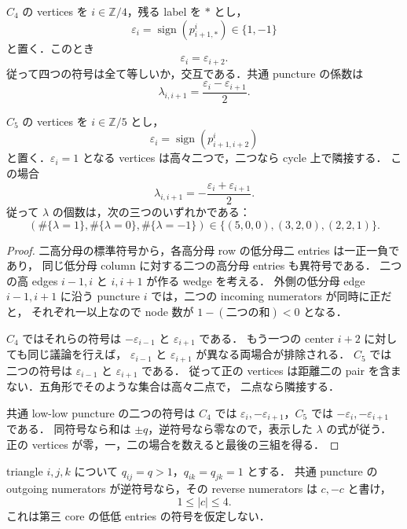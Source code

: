 \begin{proposition}\label{cn12:cycle-signs}
$C_4$ の vertices を $i\in\mathbb Z/4$，残る label を $*$ とし，
\[
 \varepsilon_i=\operatorname{sign}(p^i_{i+1,*})\in\{1,-1\}
\]
と置く．このとき
\[
 \varepsilon_i=\varepsilon_{i+2}.
\]
従って四つの符号は全て等しいか，交互である．共通 puncture の係数は
\[
 \lambda_{i,i+1}=\frac{\varepsilon_i-\varepsilon_{i+1}}2.
\]

$C_5$ の vertices を $i\in\mathbb Z/5$ とし，
\[
 \varepsilon_i=\operatorname{sign}(p^i_{i+1,i+2})
\]
と置く．$\varepsilon_i=1$ となる vertices は高々二つで，二つなら cycle 上で隣接する．
この場合
\[
 \lambda_{i,i+1}=-\frac{\varepsilon_i+\varepsilon_{i+1}}2.
\]
従って $\lambda$ の個数は，次の三つのいずれかである：
\[
 (\#\{\lambda=1\},\#\{\lambda=0\},\#\{\lambda=-1\})
 \in\{(5,0,0),(3,2,0),(2,2,1)\}.
\]
\end{proposition}

\begin{proof}
二高分母の標準符号から，各高分母 row の低分母二 entries は一正一負であり，
同じ低分母 column に対する二つの高分母 entries も異符号である．
二つの高 edges $i-1,i$ と $i,i+1$ が作る wedge を考える．
外側の低分母 edge $i-1,i+1$ に沿う puncture $i$ では，二つの incoming numerators が同時に正だと，
それぞれ一以上なので node 数が $1-(\text{二つの和})<0$ となる．

$C_4$ ではそれらの符号は $-\varepsilon_{i-1}$ と $\varepsilon_{i+1}$ である．
もう一つの center $i+2$ に対しても同じ議論を行えば，
$\varepsilon_{i-1}$ と $\varepsilon_{i+1}$ が異なる両場合が排除される．
$C_5$ では二つの符号は $\varepsilon_{i-1}$ と $\varepsilon_{i+1}$ である．
従って正の vertices は距離二の pair を含まない．五角形でそのような集合は高々二点で，
二点なら隣接する．

共通 low-low puncture の二つの符号は $C_4$ では
$\varepsilon_i,-\varepsilon_{i+1}$，$C_5$ では
$-\varepsilon_i,-\varepsilon_{i+1}$ である．
同符号なら和は $\pm q$，逆符号なら零なので，表示した $\lambda$ の式が従う．
正の vertices が零，一，二の場合を数えると最後の三組を得る．
\end{proof}

\begin{lemma}\label{cn12:reverse-bound}
triangle $i,j,k$ について $q_{ij}=q>1$，$q_{ik}=q_{jk}=1$ とする．
共通 puncture の outgoing numerators が逆符号なら，その reverse numerators は $c,-c$ と書け，
\[
 1\leq |c|\leq4.
\]
これは第三 core の低低 entries の符号を仮定しない．
\end{lemma}

